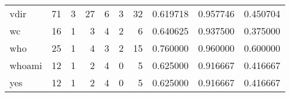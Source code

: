 \begin{tabular}{lrrrrrrrrr}
vdir      &                                      71 &                                                  3 &                                                 27 &                                                  6 &                                                  3 &                                                 32 &                                           0.619718 &                               0.957746 &                             0.450704 \\
wc        &                                      16 &                                                  1 &                                                  3 &                                                  4 &                                                  2 &                                                  6 &                                           0.640625 &                               0.937500 &                             0.375000 \\
who       &                                      25 &                                                  1 &                                                  4 &                                                  3 &                                                  2 &                                                 15 &                                           0.760000 &                               0.960000 &                             0.600000 \\
whoami    &                                      12 &                                                  1 &                                                  2 &                                                  4 &                                                  0 &                                                  5 &                                           0.625000 &                               0.916667 &                             0.416667 \\
yes       &                                      12 &                                                  1 &                                                  2 &                                                  4 &                                                  0 &                                                  5 &                                           0.625000 &                               0.916667 &                             0.416667 \\
\bottomrule
\end{tabular}
